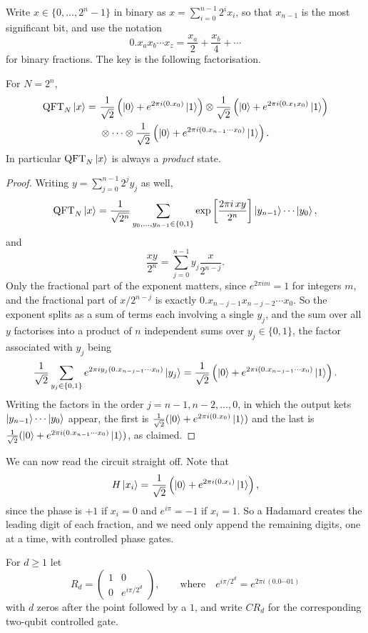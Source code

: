 \documentclass[a4paper]{scrartcl}
\newcommand{\QFT}{\operatorname{QFT}}
\begin{document}
Write $x\in\{0,\dots,2^n-1\}$ in binary as $x = \sum_{i=0}^{n-1}2^ix_i$, so that $x_{n-1}$ is the most significant bit, and use the notation
$$0.x_ax_b\cdots x_z = \frac{x_a}{2}+\frac{x_b}{4}+\cdots$$
for binary fractions. The key is the following factorisation.

\begin{proposition}
	For $N = 2^n$,
	\begin{align*}
		\QFT_N\ket x = \ &\frac{1}{\sqrt2}\left(\ket0 + e^{2\pi i(0.x_0)}\ket1\right)\otimes\frac1{\sqrt2}\left(\ket0+e^{2\pi i(0.x_1x_0)}\ket1\right)\\
		&\otimes\cdots\otimes\frac1{\sqrt2}\left(\ket0+e^{2\pi i(0.x_{n-1}\cdots x_0)}\ket1\right).
	\end{align*}
	In particular $\QFT_N\ket x$ is always a \emph{product} state.
\end{proposition}

\begin{proof}
	Writing $y = \sum_{j=0}^{n-1}2^jy_j$ as well,
	$$\QFT_N\ket x = \frac1{\sqrt{2^n}}\sum_{y_0,\dots,y_{n-1}\in\{0,1\}}\exp\left[\frac{2\pi i\,xy}{2^n}\right]\ket{y_{n-1}}\cdots\ket{y_0},$$
	and
	$$\frac{xy}{2^n} = \sum_{j=0}^{n-1}y_j\frac{x}{2^{n-j}}.$$
	Only the fractional part of the exponent matters, since $e^{2\pi i m} = 1$ for integers $m$, and the fractional part of $x/2^{n-j}$ is exactly $0.x_{n-j-1}x_{n-j-2}\cdots x_0$. So the exponent splits as a sum of terms each involving a single $y_j$, and the sum over all $y$ factorises into a product of $n$ independent sums over $y_j\in\{0,1\}$, the factor associated with $y_j$ being
	$$\frac1{\sqrt2}\sum_{y_j\in\{0,1\}}e^{2\pi iy_j(0.x_{n-j-1}\cdots x_0)}\ket{y_j} = \frac1{\sqrt2}\left(\ket0+e^{2\pi i(0.x_{n-j-1}\cdots x_0)}\ket1\right).$$
	Writing the factors in the order $j = n-1, n-2,\dots,0$, in which the output kets $\ket{y_{n-1}}\cdots\ket{y_0}$ appear, the first is $\tfrac1{\sqrt2}(\ket0+e^{2\pi i(0.x_0)}\ket1)$ and the last is $\tfrac1{\sqrt2}(\ket0+e^{2\pi i(0.x_{n-1}\cdots x_0)}\ket1)$, as claimed.
\end{proof}

We can now read the circuit straight off. Note that
$$H\ket{x_i} = \frac1{\sqrt2}\left(\ket0+e^{2\pi i(0.x_i)}\ket1\right),$$
since the phase is $+1$ if $x_i = 0$ and $e^{i\pi} = -1$ if $x_i = 1$. So a Hadamard creates the leading digit of each fraction, and we need only append the remaining digits, one at a time, with controlled phase gates.

\begin{definition}
	For $d\geq1$ let
	$$R_d = \begin{pmatrix} 1 & 0 \\ 0 & e^{i\pi/2^d}\end{pmatrix}, \qquad\text{where}\quad e^{i\pi/2^d} = e^{2\pi i\,(0.0\cdots01)}$$
	with $d$ zeros after the point followed by a $1$, and write $CR_d$ for the corresponding two-qubit controlled gate.
\end{definition}
\end{document}
